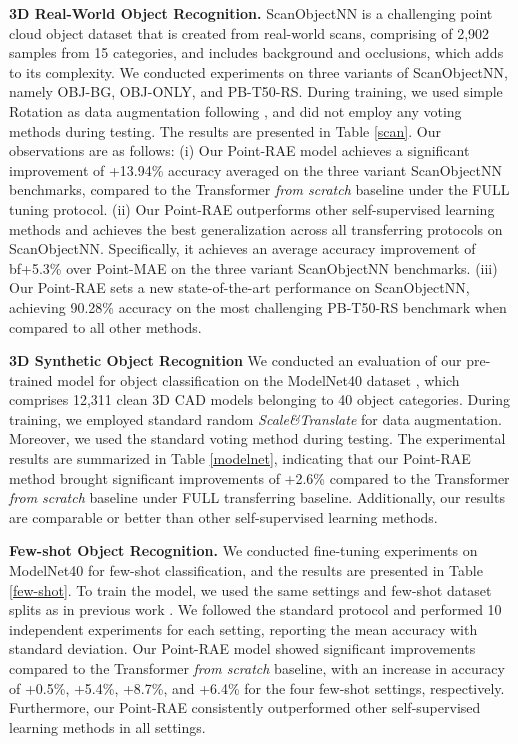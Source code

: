 \documentclass[sigconf, screen]{acmart}
\begin{document}
\noindent \textbf{3D Real-World Object Recognition.}
ScanObjectNN \cite{uy2019revisiting} is a challenging point cloud object dataset that is created from real-world scans, comprising of 2,902 samples from 15 categories, and includes background and occlusions, which adds to its complexity. We conducted experiments on three variants of ScanObjectNN, namely OBJ-BG, OBJ-ONLY, and PB-T50-RS. During training, we used simple Rotation as data augmentation following \cite{dong2022autoencoders}, and did not employ any voting methods during testing. The results are presented in Table \ref{scan}. Our observations are as follows:
(i) Our Point-RAE model achieves a significant improvement of +13.94\% accuracy averaged on the three variant ScanObjectNN benchmarks, compared to the Transformer \textit{from scratch} baseline under the FULL tuning protocol.
(ii) Our Point-RAE outperforms other self-supervised learning methods and achieves the best generalization across all transferring protocols on ScanObjectNN. Specifically, it achieves an average accuracy improvement of bf+5.3\% over Point-MAE on the three variant ScanObjectNN benchmarks.
(iii) Our Point-RAE sets a new state-of-the-art performance on ScanObjectNN, achieving 90.28\% accuracy on the most challenging PB-T50-RS benchmark when compared to all other methods.


\noindent \textbf{3D Synthetic Object Recognition}
We conducted an evaluation of our pre-trained model for object classification on the ModelNet40 dataset \cite{wu20153d}, which comprises 12,311 clean 3D CAD models belonging to 40 object categories. 
During training, we employed standard random \textit{Scale\&Translate} for data augmentation. Moreover, we used the standard voting method \cite{liu2019relation} during testing. The experimental results are summarized in Table \ref{modelnet}, indicating that our Point-RAE method brought significant improvements of +2.6\% compared to the Transformer \textit{from scratch} baseline under FULL transferring baseline. Additionally, our results are comparable or better than other self-supervised learning methods.



\noindent \textbf{Few-shot Object Recognition.}
We conducted fine-tuning experiments on ModelNet40 \cite{wu20153d} for few-shot classification, and the results are presented in Table \ref{few-shot}. To train the model, we used the same settings and few-shot dataset splits as in previous work \cite{yu2022point, pang2022masked}.
We followed the standard protocol and performed 10 independent experiments for each setting, reporting the mean accuracy with standard deviation.
Our Point-RAE model showed significant improvements compared to the Transformer \textit{from scratch} baseline, with an increase in accuracy of +0.5\%, +5.4\%, +8.7\%, and +6.4\% for the four few-shot settings, respectively. Furthermore, our Point-RAE consistently outperformed other self-supervised learning methods in all settings.
\end{document}
